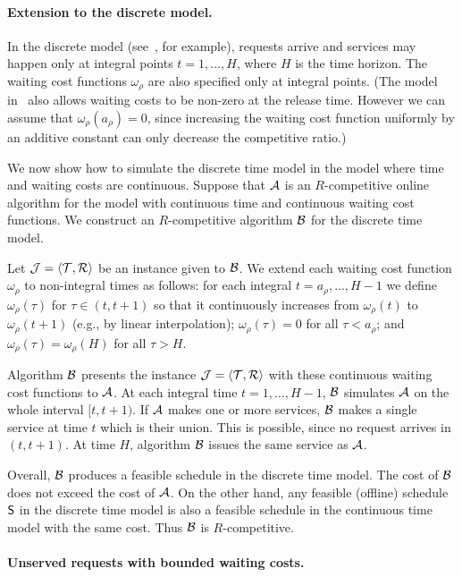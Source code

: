 \documentclass[a4paper]{article}
\newcommand{\calA}{{\cal A}}
\newcommand{\calB}{{\cal B}}
\newcommand{\calJ}{{\cal J}}
\newcommand{\calR}{{\cal R}}
\newcommand{\calT}{{\cal T}}
\newcommand{\angled}[1]{{ \left\langle #1 \right\rangle }}
\newcommand{\schedS}{\mbox{\rm\textsf{S}}}
\begin{document}
\paragraph{Extension to the discrete model.} 

In the discrete model (see~\cite{jrp-online-buchbinder}, for example), 
requests arrive and services may happen only at integral
points $t=1,\ldots,H$, where $H$ is the time horizon. The waiting
cost functions $\omega_\rho$ are also specified only at integral
points. (The model in~\cite{jrp-online-buchbinder} also allows waiting costs to be
non-zero at the release time. However we can assume that $\omega_\rho(a_\rho)=0$, since
increasing the waiting cost function uniformly by an additive constant can only decrease the
competitive ratio.)

We now show how to simulate the discrete time model in the model where time
and waiting costs are continuous. Suppose that $\calA$ is an
$R$-competitive online algorithm for the model with continuous time and continuous 
waiting cost functions.  We construct an $R$-competitive
algorithm $\calB$ for the discrete time model.

Let $\calJ=\angled{\calT,\calR}$ be an instance given to $\calB$. We
extend each waiting cost function $\omega_\rho$ to non-integral
times as follows: for each integral $t=a_\rho,\ldots,H-1$ we define
$\omega_\rho(\tau)$ for $\tau\in(t,t+1)$ so that it continuously
increases from $\omega_\rho(t)$ to $\omega_\rho(t+1)$ (e.g., by linear interpolation);
$\omega_\rho(\tau)=0$ for all $\tau<a_\rho$; and
$\omega_\rho(\tau)=\omega_\rho(H)$ for all $\tau>H$. 

Algorithm $\calB$ presents the instance $\calJ=\angled{\calT,\calR}$
with these continuous waiting cost functions to $\calA$. At each
integral time $t=1,\ldots,H-1$, $\calB$ simulates $\calA$ on the whole
interval $[t,t+1)$.  If $\calA$ makes one or more services, $\calB$
makes a single service at time $t$ which is their union. This is
possible, since no request arrives in $(t,t+1)$. At time $H$,
algorithm $\calB$ issues the same service as $\calA$.

Overall, $\calB$ produces a feasible schedule in the discrete time model. 
The cost of $\calB$ does not exceed the cost of
$\calA$.  On the other hand, any feasible (offline) schedule $\schedS$
in the discrete time model is also a feasible schedule in the
continuous time model with the same cost. Thus $\calB$ is
$R$-competitive.


\paragraph{Unserved requests with bounded waiting costs.}
\end{document}
